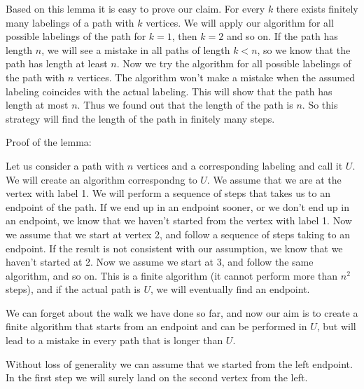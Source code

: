\documentclass{article}
\begin{document}
Based on this lemma it is easy to prove our claim. For every \(\displaystyle k\) there exists finitely many labelings of a path with \(\displaystyle k\) vertices. We will apply our algorithm for all possible labelings of the path for \(\displaystyle k=1\), then \(\displaystyle k=2\) and so on. If the path has length \(\displaystyle n\), we will see a mistake in all paths of length \(\displaystyle k<n\), so we know that the path has length at least \(\displaystyle n\). Now we try the algorithm for all possible labelings of the path with \(\displaystyle n\) vertices. The algorithm won't make a mistake when the assumed labeling coincides with the actual labeling. This will show that the path has length at most \(\displaystyle n\). Thus we found out that the length of the path is \(\displaystyle n\). So this strategy will find the length of the path in finitely many steps.

Proof of the lemma:

Let us consider a path with \(\displaystyle n\) vertices and a corresponding labeling and call it \(\displaystyle U\). We will create an algorithm correspondng to \(\displaystyle U\). We assume that we are at the vertex with label 1. We will perform a sequence of steps that takes us to an endpoint of the path. If we end up in an endpoint sooner, or we don't end up in an endpoint, we know that we haven't started from the vertex with label 1. Now we assume that we start at vertex 2, and follow a sequence of steps taking to an endpoint. If the result is not consistent with our assumption, we know that we haven't started at 2. Now we assume we start at 3, and follow the same algorithm, and so on. This is a finite algorithm (it cannot perform more than \(\displaystyle n^2\) steps), and if the actual path is \(\displaystyle U\), we will eventually find an endpoint.

We can forget about the walk we have done so far, and now our aim is to create a finite algorithm that starts from an endpoint and can be performed in \(\displaystyle U\), but will lead to a mistake in every path that is longer than \(\displaystyle U\).

Without loss of generality we can assume that we started from the left endpoint. In the first step we will surely land on the second vertex from the left.
\end{document}
